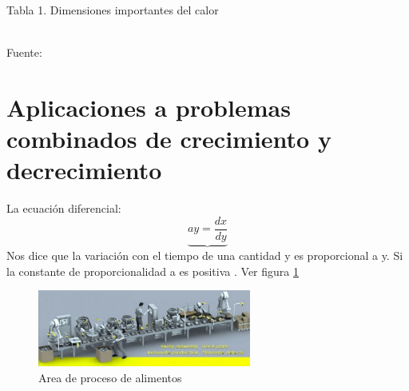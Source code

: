 \documentclass[12pt,a4paper]{article}
\begin{document}
\begin{center}
Tabla 1. Dimensiones importantes del calor
\end{center}
\begin{minipage}[b]{1.0\linewidth}
 \hfill {}
 \hfill {}
  \hfill  {}
  \hfill  {}
  \hfill  {}
 \hfill {}
 \hfill {}
 \hfill {}
 \hfill {}
 \hfill \framebox[0.5\linewidth][c]{$\sigma$}\\

Fuente:\cite{Yunus2007}\\
\end{minipage}

\section{Aplicaciones a problemas combinados de crecimiento y decrecimiento}
La ecuación diferencial:
\begin{equation}
\underbrace{ay = \dfrac{dx}{dy}} 
\end{equation}
Nos dice que la variación con el tiempo de una cantidad y es proporcional a y. Si la constante de proporcionalidad a es positiva \cite{Levenspiel2004}. Ver figura \ref{fig:proceso} \\

\begin{figure}[h!]
\centering
\includegraphics[width=7cm]{proceso}
\caption{Area de proceso de alimentos}
\label{fig:proceso}
\end{figure}
\newpage


\end{document}
